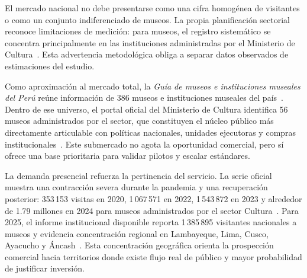 El mercado nacional no debe presentarse como una cifra homogénea de visitantes o como un conjunto indiferenciado de museos. La propia planificación sectorial reconoce limitaciones de medición: para museos, el registro sistemático se concentra principalmente en las instituciones administradas por el Ministerio de Cultura~\cite{cultura2020politica,cultura2025pei}. Esta advertencia metodológica obliga a separar datos observados de estimaciones del estudio.

Como aproximación al mercado total, la \textit{Guía de museos e instituciones museales del Perú} reúne información de 386 museos e instituciones museales del país~\cite{cultura2023guiamuseos}. Dentro de ese universo, el portal oficial del Ministerio de Cultura identifica 56 museos administrados por el sector, que constituyen el núcleo público más directamente articulable con políticas nacionales, unidades ejecutoras y compras institucionales~\cite{museoscultura}. Este submercado no agota la oportunidad comercial, pero sí ofrece una base prioritaria para validar pilotos y escalar estándares.

La demanda presencial refuerza la pertinencia del servicio. La serie oficial muestra una contracción severa durante la pandemia y una recuperación posterior: 353\,153 visitas en 2020, 1\,067\,571 en 2022, 1\,543\,872 en 2023 y alrededor de 1.79 millones en 2024 para museos administrados por el sector Cultura~\cite{cultura2020memoria,cultura2022memoria,cultura2023memoria,cultura2024reporte}. Para 2025, el informe institucional disponible reporta 1\,385\,895 visitantes nacionales a museos y evidencia concentración regional en Lambayeque, Lima, Cusco, Ayacucho y Áncash~\cite{cultura2025evaluacion}. Esta concentración geográfica orienta la prospección comercial hacia territorios donde existe flujo real de público y mayor probabilidad de justificar inversión.


